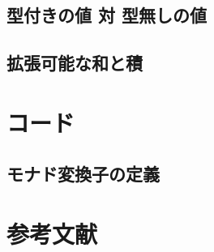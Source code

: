 \documentclass[11pt, oneside]{jsbook}   	%
\begin{document}
\section{ 型付きの値 対 型無しの値 }
\section{ 拡張可能な和と積 }


\newpage
\chapter{コード}
\section{ モナド変換子の定義 }
\newpage

\newpage

\newpage

\newpage

\newpage

\newpage

\newpage

\newpage

\newpage



\chapter{参考文献}
\end{document}
